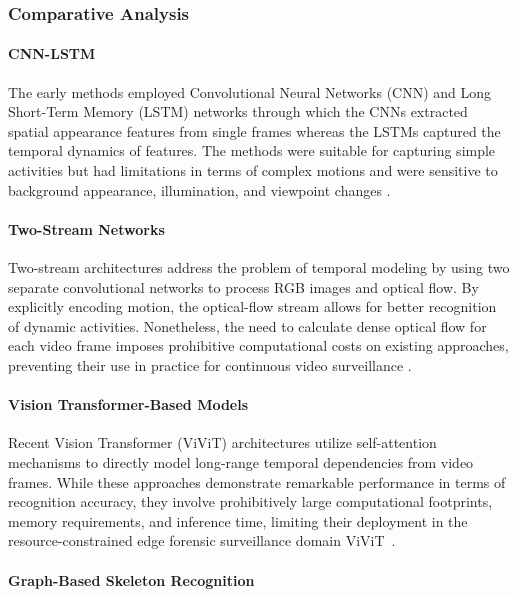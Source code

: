 \documentclass[conference]{IEEEtran}
\begin{document}
\subsubsection{Comparative Analysis}

\paragraph{CNN-LSTM}

The early methods employed Convolutional Neural Networks (CNN) and Long Short-Term Memory (LSTM) networks through which the CNNs extracted spatial appearance features from single frames whereas the LSTMs captured the temporal dynamics of features. The methods were suitable for capturing simple activities but had limitations in terms of complex motions and were sensitive to background appearance, illumination, and viewpoint changes \cite{cnnlstm}.

\paragraph{Two-Stream Networks}

Two-stream architectures address the problem of temporal modeling by using two separate convolutional networks to process RGB images and optical flow. By explicitly encoding motion, the optical-flow stream allows for better recognition of dynamic activities. Nonetheless, the need to calculate dense optical flow for each video frame imposes prohibitive computational costs on existing approaches, preventing their use in practice for continuous video surveillance \cite{twostreamlstm}.

\paragraph{Vision Transformer-Based Models}

Recent Vision Transformer (ViViT) architectures utilize self-attention mechanisms to directly model long-range temporal dependencies from video frames. While these approaches demonstrate remarkable performance in terms of recognition accuracy, they involve prohibitively large computational footprints, memory requirements, and inference time, limiting their deployment in the resource-constrained edge forensic surveillance domain ViViT~\cite{liu2022video}.

\paragraph{Graph-Based Skeleton Recognition}
\end{document}
